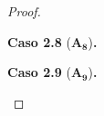 \documentclass{report}
\begin{document}
\begin{proof}
\begin{case}
\begin{case}
                    \begin{case}
                        \textbf{Caso 2.8} ($\mathbf{A_8}$)\textbf{.}
                    \end{case}

                    \begin{case}
                        \textbf{Caso 2.9} ($\mathbf{A_9}$)\textbf{.}
                    \end{case}
                \end{case}
        \end{case}
    \end{proof}




        
\end{document}
